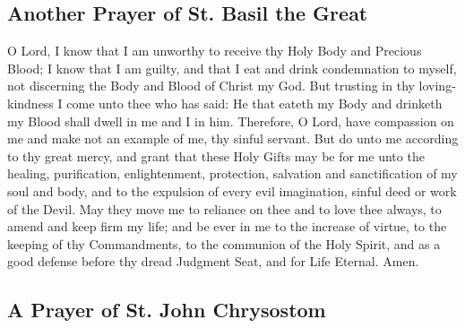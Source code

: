 \subsection{Another Prayer of St. Basil the Great}

    O Lord, I know that I am unworthy to receive thy Holy Body and Precious Blood; I know that I am guilty, and that I eat and drink condemnation to myself, not discerning the Body and Blood of Christ my God. But trusting in thy loving-kindness I come unto thee who has said: He that eateth my Body and drinketh my Blood shall dwell in me and I in him. Therefore, O Lord, have compassion on me and make not an example of me, thy sinful servant. But do unto me according to thy great mercy, and grant that these Holy Gifts may be for me unto the healing, purification, enlightenment, protection, salvation and sanctification of my soul and body, and to the expulsion of every evil imagination, sinful deed or work of the Devil. May they move me to reliance on thee and to love thee always, to amend and keep firm my life; and be ever in me to the increase of virtue, to the keeping of thy Commandments, to the communion of the Holy Spirit, and as a good defense before thy dread Judgment Seat, and for Life Eternal. Amen.

\subsection{A Prayer of St. John Chrysostom}

